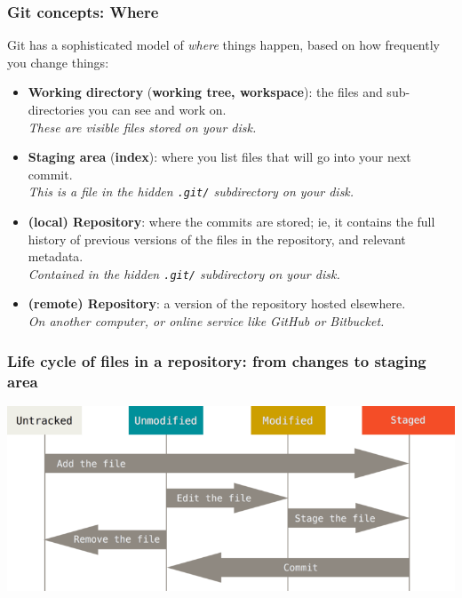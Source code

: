 \documentclass[10pt,svgnames]{beamer}
\begin{document}
\begin{frame}
\frametitle{Git concepts: Where}

Git has a sophisticated model of \emph{where} things happen, based on how frequently you change things:

\begin{itemize}
\item \textbf{Working directory} (\textbf{working tree, workspace}): the files and sub-directories you can see and work on.\\
\emph{These are visible files stored on your disk.}
\smallskip

\item \textbf{Staging area} (\textbf{index}): where you list files that will go into your next commit.\\
\emph{This is a file in the hidden \texttt{.git/} subdirectory on your disk.}\smallskip

\item \textbf{(local) Repository}: where the commits are stored; ie, it contains the full history of previous versions of the files in the repository, and relevant metadata.\\
\emph{Contained in the hidden \texttt{.git/} subdirectory on your disk.}
\smallskip

\item \textbf{(remote) Repository}: a version of the repository hosted elsewhere.\\
\emph{On another computer, or online service like GitHub or Bitbucket.}
\end{itemize}
\end{frame}


\begin{frame}
\frametitle{Life cycle of files in a repository: from changes to staging area}
\begin{centering}
\includegraphics[width=\linewidth]{figures/lifecycle.png}
\end{centering}
\end{frame}
\end{document}
